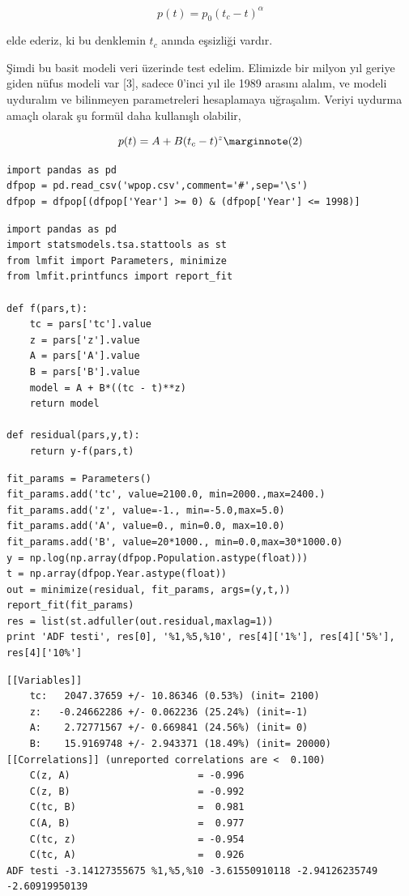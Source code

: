 \documentclass[12pt,fleqn]{article}\usepackage{../../common}
\begin{document}
$$ p(t) = p_0 (t_c - t)^\alpha $$

elde ederiz, ki bu denklemin $t_c$ anında eşsizliği vardır. 

Şimdi bu basit modeli veri üzerinde test edelim. Elimizde bir milyon yıl
geriye giden nüfus modeli var [3], sadece 0'inci yıl ile 1989 arasını alalım,
ve modeli uyduralım ve bilinmeyen parametreleri hesaplamaya uğraşalım. 
Veriyi uydurma amaçlı olarak şu formül daha kullanışlı olabilir,

$$ 
p(t) = A + B(t_c - t)^z 
\mlabel{2} 
$$

\begin{verbatim}
import pandas as pd
dfpop = pd.read_csv('wpop.csv',comment='#',sep='\s')
dfpop = dfpop[(dfpop['Year'] >= 0) & (dfpop['Year'] <= 1998)]
\end{verbatim}

\begin{verbatim}
import pandas as pd
import statsmodels.tsa.stattools as st
from lmfit import Parameters, minimize
from lmfit.printfuncs import report_fit

def f(pars,t):
    tc = pars['tc'].value
    z = pars['z'].value
    A = pars['A'].value
    B = pars['B'].value
    model = A + B*((tc - t)**z)
    return model
    
def residual(pars,y,t):
    return y-f(pars,t)
\end{verbatim}

\begin{verbatim}
fit_params = Parameters()
fit_params.add('tc', value=2100.0, min=2000.,max=2400.)
fit_params.add('z', value=-1., min=-5.0,max=5.0)
fit_params.add('A', value=0., min=0.0, max=10.0)
fit_params.add('B', value=20*1000., min=0.0,max=30*1000.0)
y = np.log(np.array(dfpop.Population.astype(float)))
t = np.array(dfpop.Year.astype(float))
out = minimize(residual, fit_params, args=(y,t,))
report_fit(fit_params)
res = list(st.adfuller(out.residual,maxlag=1))
print 'ADF testi', res[0], '%1,%5,%10', res[4]['1%'], res[4]['5%'], res[4]['10%']
\end{verbatim}

\begin{verbatim}
[[Variables]]
    tc:   2047.37659 +/- 10.86346 (0.53%) (init= 2100)
    z:   -0.24662286 +/- 0.062236 (25.24%) (init=-1)
    A:    2.72771567 +/- 0.669841 (24.56%) (init= 0)
    B:    15.9169748 +/- 2.943371 (18.49%) (init= 20000)
[[Correlations]] (unreported correlations are <  0.100)
    C(z, A)                      = -0.996 
    C(z, B)                      = -0.992 
    C(tc, B)                     =  0.981 
    C(A, B)                      =  0.977 
    C(tc, z)                     = -0.954 
    C(tc, A)                     =  0.926 
ADF testi -3.14127355675 %1,%5,%10 -3.61550910118 -2.94126235749 -2.60919950139
\end{verbatim}
\end{document}
